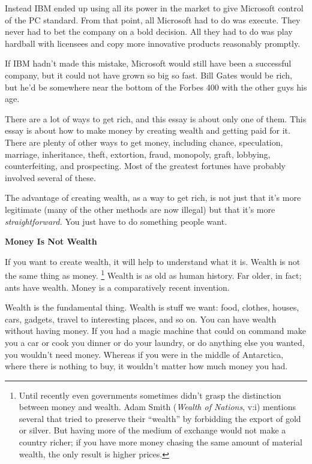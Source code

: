 Instead IBM ended up using all its power in the market to give Microsoft
control of the PC standard. From that point, all Microsoft had to do was
execute. They never had to bet the company on a bold decision. All they
had to do was play hardball with licensees and copy more innovative
products reasonably promptly.

If IBM hadn't made this mistake, Microsoft would still have been a
successful company, but it could not have grown so big so fast. Bill
Gates would be rich, but he'd be somewhere near the bottom of the Forbes
400 with the other guys his age.

There are a lot of ways to get rich, and this essay is about only one of
them. This essay is about how to make money by creating wealth and
getting paid for it. There are plenty of other ways to get money,
including chance, speculation, marriage, inheritance, theft, extortion,
fraud, monopoly, graft, lobbying, counterfeiting, and prospecting. Most
of the greatest fortunes have probably involved several of these.

The advantage of creating wealth, as a way to get rich, is not just that
it's more legitimate (many of the other methods are now illegal) but
that it's more \emph{straightforward.} You just have to do something
people want.

\textbf{Money Is Not Wealth}

If you want to create wealth, it will help to understand what it is.
Wealth is not the same thing as money. \footnote{Until recently even governments sometimes didn't grasp the
distinction between money and wealth. Adam Smith (\emph{Wealth of
Nations}, v:i) mentions several that tried to preserve their ``wealth''
by forbidding the export of gold or silver. But having more of the
medium of exchange would not make a country richer; if you have more
money chasing the same amount of material wealth, the only result is
higher prices.} Wealth is
as old as human history. Far older, in fact; ants have wealth. Money is
a comparatively recent invention.

Wealth is the fundamental thing. Wealth is stuff we want: food, clothes,
houses, cars, gadgets, travel to interesting places, and so on. You can
have wealth without having money. If you had a magic machine that could
on command make you a car or cook you dinner or do your laundry, or do
anything else you wanted, you wouldn't need money. Whereas if you were
in the middle of Antarctica, where there is nothing to buy, it wouldn't
matter how much money you had.

